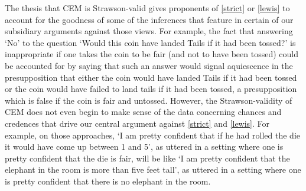 \documentclass[If.tex]{subfiles}
\begin{document}
The thesis that CEM is Strawson-valid gives proponents of \ref{strict} or \ref{lewis} to account for the goodness of some of the inferences that feature in certain of our subsidiary arguments against those views.  For example, the fact that answering ‘No’ to the question ‘Would this coin have landed Tails if it had been tossed?’ is inappropriate if one takes the coin to be fair (and not to have been tossed) could be accounted for by saying that such an answer would signal aquiescence in the presupposition that either the coin would have landed Tails if it had been tossed or the coin would have failed to land tails if it had been tossed, a presupposition which is false if the coin is fair and untossed.  However, the Strawson-validity of CEM does not even begin to make sense of the data concerning chances and credences that drive our central argument against \ref{strict} and \ref{lewis}.  For example, on those approaches, ‘I am pretty confident that if he had rolled the die it would have come up between 1 and 5’, as uttered in a setting where one is pretty confident that the die is fair, will be like ‘I am pretty confident that the elephant in the room is more than five feet tall’, as uttered in a setting where one is pretty confident that there is no elephant in the room.  
\end{document}
